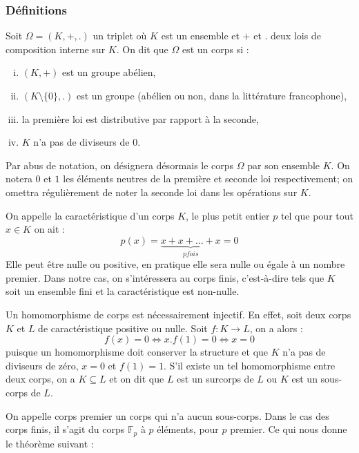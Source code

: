 \documentclass[a4paper]{article} %
\numberwithin{equation}{section}
\newcommand\GF[1]{\mathbb{F}_{#1}}
\begin{document}
\subsubsection{Définitions}

Soit $\Omega = (K, +, .)$ un triplet où $K$ est un ensemble et $+$ et $.$ deux
lois de composition interne sur $K$. On dit que $\Omega$ est un corps si : 
\begin{enumerate}[(i)]
\item $(K, +)$ est un groupe abélien,
\item $(K\setminus\lbrace0\rbrace,.)$ est un groupe (abélien ou non, dans la 
littérature francophone),
\item la première loi est distributive par rapport à la seconde,
\item $K$ n'a pas de diviseurs de $0$.
\end{enumerate}
Par abus de notation, on désignera désormais le corps $\Omega$ par son ensemble
$K$. On notera $0$ et $1$ les éléments neutres de la première et seconde loi 
respectivement; on omettra régulièrement de noter la seconde loi dans les 
opérations sur $K$.\par
On appelle la caractéristique d'un corps $K$, le plus petit entier $p$ tel que 
pour tout $x\in K$ on ait :
\[p(x) = \underbrace{x + x + \dots + x}_{p fois} = 0\]
Elle peut être nulle ou positive, en pratique elle sera nulle ou égale à un
nombre premier. Dans notre cas, on s'intéressera au corps finis, c'est-à-dire 
tels que $K$ soit un ensemble fini et la caractéristique est non-nulle.\par
\vspace{0.3cm}
Un homomorphisme de corps est nécessairement injectif. En effet, soit deux corps
$K$ et $L$ de caractéristique positive ou nulle. Soit $f : K \to L$, on a alors 
:
\[f(x) = 0 \Leftrightarrow x.f(1) = 0 \Leftrightarrow x = 0\]
puisque un homomorphisme doit conserver la structure et que $K$ n'a pas de
diviseurs de zéro, $x = 0$ et $f(1) = 1$. S'il existe un
tel homomorphisme entre deux corps, on a $K\subseteq L$ et on dit que $L$ est un
surcorps de $L$ ou $K$ est un sous-corps de $L$.\par
On appelle corps premier un corps qui n'a aucun sous-corps. Dans le cas des
corps finis, il s'agit du corps $\GF{p}$ à $p$ éléments, pour $p$ premier. Ce
qui nous donne le théorème suivant :
\end{document}
